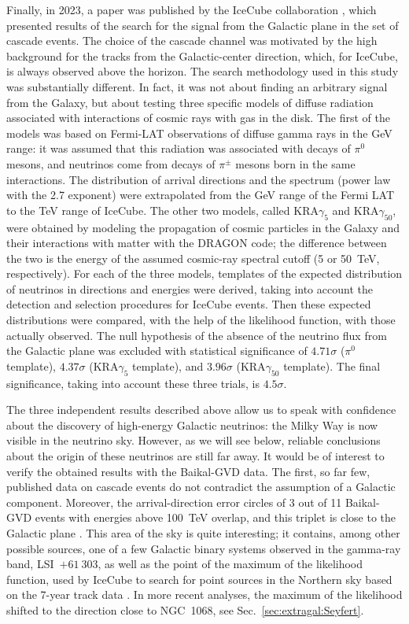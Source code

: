 \documentclass[a4paper,noshowpacs,noshowkeys,floatfix,twocolumn,preprintnumbers,nofootinbib]{revtex4-2}
\begin{document}
Finally, in 2023, a paper was published by the IceCube collaboration \cite{IceCube-gal-Science}, which presented results of the search for the signal from the Galactic plane in the set of cascade events. The choice of the cascade channel was motivated by the high background for the tracks from the Galactic-center direction, which, for IceCube, is always observed above the horizon. The search methodology used in this study was substantially different. In fact, it was not about finding an arbitrary signal from the Galaxy, but about testing three specific models of diffuse radiation associated with interactions of cosmic rays with gas in the disk. The first of the models was based on Fermi-LAT observations of diffuse gamma rays in the GeV range: it was assumed that this radiation was associated with decays of $\pi^{0}$ mesons, and neutrinos come from decays of $\pi^{\pm}$ mesons born in the same interactions. The distribution of arrival directions and the spectrum (power law with the 2.7 exponent) were extrapolated from the GeV range of the Fermi LAT to the TeV range of IceCube. The other two models, called KRA$\gamma_{5}$ and KRA$\gamma_{50}$, were obtained by modeling the propagation of cosmic particles in the Galaxy  and their interactions with matter with the DRAGON code; the difference between the two is the energy of the assumed cosmic-ray spectral cutoff (5 or 50~TeV, respectively). For each of the three models, templates of the expected distribution of neutrinos in directions and energies were derived, taking into account the detection and selection procedures for IceCube events. Then these expected distributions were compared, with the help of the likelihood function, with those actually observed. The null hypothesis of the absence of the neutrino flux from the Galactic plane was excluded with statistical significance of $4.71\sigma$ ($\pi^{0}$ template), $4.37\sigma$ (KRA$\gamma_{5}$ template), and $3.96\sigma$ (KRA$\gamma_{50}$ template). The final significance, taking into account these three trials, is $4.5\sigma$.

The three independent results described above allow us to speak with confidence about the discovery of high-energy Galactic neutrinos: the Milky Way is now visible in the neutrino sky. However, as we will see below, reliable conclusions about the origin of these neutrinos are still far away. It would be of  interest to verify the obtained results with the Baikal-GVD data. The first, so far few, published data on cascade events do not contradict the assumption of a Galactic component. Moreover, the arrival-direction error circles of 3 out of 11 Baikal-GVD events with energies above 100~TeV overlap, and this triplet is close to the Galactic plane \cite{Baikal-Nikita}. This area of the sky is quite interesting; it contains, among other possible sources, one of a few Galactic binary systems observed in the gamma-ray band, LSI~$+61~303$, as well as the point of the maximum of the likelihood function, used by IceCube to search for point sources in the Northern sky based on the 7-year track data \cite{IceCube7yrSources}. In more recent analyses, the maximum of the likelihood shifted to the direction close to NGC~1068, see Sec.~\ref{sec:extragal:Seyfert}.
\end{document}
